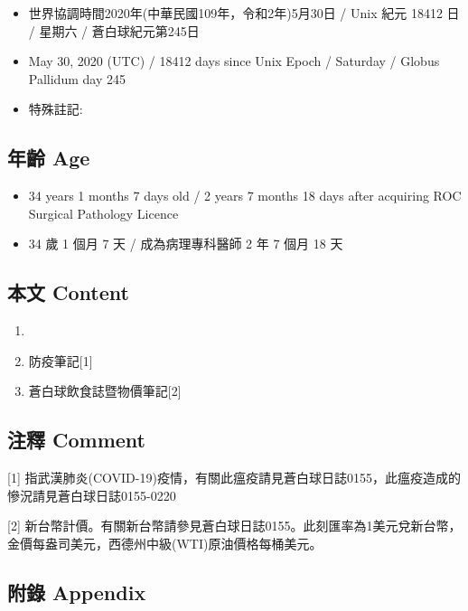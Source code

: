 \documentclass[
]{article}
\providecommand{\tightlist}{%
  \setlength{\itemsep}{0pt}\setlength{\parskip}{0pt}}
\begin{document}
\begin{itemize}
\tightlist
\item
  世界協調時間2020年(中華民國109年，令和2年)5月30日 / Unix 紀元 18412 日
  / 星期六 / 蒼白球紀元第245日
\item
  May 30, 2020 (UTC) / 18412 days since Unix Epoch / Saturday / Globus
  Pallidum day 245
\item
  特殊註記:
\end{itemize}

\hypertarget{ux5e74ux9f61-age-29}{%
\subsection{年齡 Age}\label{ux5e74ux9f61-age-29}}

\begin{itemize}
\tightlist
\item
  34 years 1 months 7 days old / 2 years 7 months 18 days after
  acquiring ROC Surgical Pathology Licence
\item
  34 歲 1 個月 7 天 / 成為病理專科醫師 2 年 7 個月 18 天
\end{itemize}

\hypertarget{ux672cux6587-content-29}{%
\subsection{本文 Content}\label{ux672cux6587-content-29}}

\begin{enumerate}
\def\labelenumi{\arabic{enumi}.}
\item
\item
  防疫筆記{[}1{]}
\item
  蒼白球飲食誌暨物價筆記{[}2{]}
\end{enumerate}

\hypertarget{ux6ce8ux91cb-comment-29}{%
\subsection{注釋 Comment}\label{ux6ce8ux91cb-comment-29}}

{[}1{]}
指武漢肺炎(COVID-19)疫情，有關此瘟疫請見蒼白球日誌0155，此瘟疫造成的慘況請見蒼白球日誌0155-0220

{[}2{]}
新台幣計價。有關新台幣請參見蒼白球日誌0155。此刻匯率為1美元兌新台幣，金價每盎司美元，西德州中級(WTI)原油價格每桶美元。

\hypertarget{ux9644ux9304-appendix-29}{%
\subsection{附錄 Appendix}\label{ux9644ux9304-appendix-29}}
\end{document}
